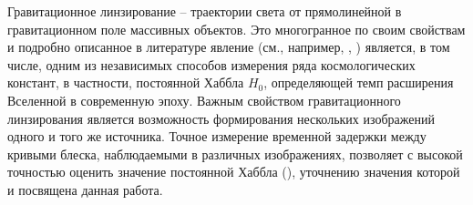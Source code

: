 Гравитационное линзирование --   траектории света от прямолинейной в гравитационном поле массивных объектов. Это многогранное по своим свойствам и подробно описанное в литературе явление (см., например, \cite{schneider1992}, \cite{gravlensbook}) является, в том числе, одним из независимых способов измерения ряда космологических констант, в частности, постоянной Хаббла $H_0$, определяющей темп расширения Вселенной в современную эпоху. Важным свойством гравитационного линзирования является возможность формирования нескольких изображений одного и того же источника. Точное измерение временной задержки между кривыми блеска, наблюдаемыми в различных изображениях, позволяет с высокой точностью оценить значение постоянной Хаббла (\cite{timedelaycosmography}),  уточнению значения которой и посвящена данная работа.


